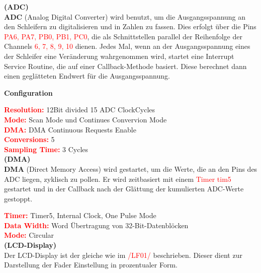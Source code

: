 \textbf{(ADC)}\\

\textbf{ADC} (Analog Digital Converter) wird benutzt, um die Ausgangsspannung an den Schleifern zu digitalisieren und in Zahlen zu fassen. Dies erfolgt über die Pins \textcolor{red}{PA6, PA7, PB0, PB1, PC0}, die als Schnittstellen parallel der Reihenfolge der Channels \textcolor{red}{6, 7, 8, 9, 10} dienen. Jedes Mal, wenn an der Ausgangsspannung eines der Schleifer eine Veränderung wahrgenommen wird, startet eine Interrupt Service Routine, die auf einer Callback-Methode basiert. Diese berechnet dann einen geglätteten Endwert für die Ausgangsspannung. 

\textbf{Configuration}

\textbf{\textcolor{red}{Resolution:}} 12Bit divided 15 ADC ClockCycles \\
\textbf{\textcolor{red}{Mode:}} Scan Mode und Continues Convervion Mode \\
\textbf{\textcolor{red}{DMA:}} DMA Continuous Requests Enable \\
\textbf{\textcolor{red}{Conversions:}} 5 \\
\textbf{\textcolor{red}{Sampling Time:}} 3 Cycles  
\\

\textbf{(DMA)}\\

\textbf{DMA} (Direct Memory Access) wird gestartet, um die Werte, die an den Pins des ADC liegen, zyklisch zu pollen. Er wird zeitbasiert mit einem \textcolor{red}{Timer tim5} gestartet und in der Callback nach der Glättung der kumulierten ADC-Werte gestoppt.

\textbf{\textcolor{red}{Timer:}} Timer5, Internal Clock, One Pulse Mode \\
\textbf{\textcolor{red}{Data Width:}} Word Übertragung von 32-Bit-Datenblöcken \\
\textbf{\textcolor{red}{Mode:}} Circular \\

\textbf{(LCD-Display)}\\

Der LCD-Display ist der gleiche wie im \textcolor{red}{/LF01/} beschrieben. Dieser dient zur Darstellung der Fader Einstellung in prozentualer Form.

\newpage

